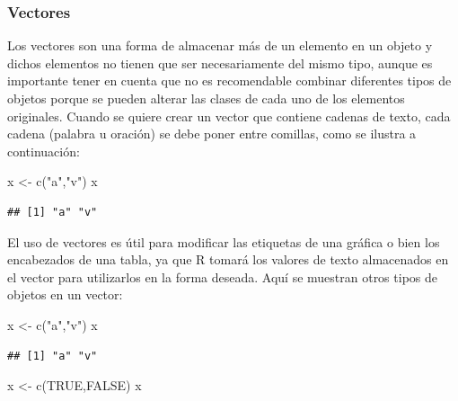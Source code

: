 \documentclass[
  11pt,
  oneside]{book}
\newenvironment{Shaded}{\begin{snugshade}}{\end{snugshade}}
\newcommand{\ConstantTok}[1]{\textcolor[rgb]{0.00,0.00,0.00}{#1}}
\newcommand{\FunctionTok}[1]{\textcolor[rgb]{0.00,0.00,0.00}{#1}}
\newcommand{\NormalTok}[1]{#1}
\newcommand{\OtherTok}[1]{\textcolor[rgb]{0.56,0.35,0.01}{#1}}
\newcommand{\StringTok}[1]{\textcolor[rgb]{0.31,0.60,0.02}{#1}}
\begin{document}
\hypertarget{vectores}{%
\subsubsection{Vectores}\label{vectores}}

Los vectores son una forma de almacenar más de un elemento en un objeto y dichos elementos no tienen que ser necesariamente del mismo tipo, aunque es importante tener en cuenta que no es recomendable combinar diferentes tipos de objetos porque se pueden alterar las clases de cada uno de los elementos originales. Cuando se quiere crear un vector que contiene cadenas de texto, cada cadena (palabra u oración) se debe poner entre comillas, como se ilustra a continuación:

\begin{Shaded}
\begin{Highlighting}[]
\NormalTok{x }\OtherTok{\textless{}{-}} \FunctionTok{c}\NormalTok{(}\StringTok{"a"}\NormalTok{,}\StringTok{"v"}\NormalTok{)}
\NormalTok{x}
\end{Highlighting}
\end{Shaded}

\begin{verbatim}
## [1] "a" "v"
\end{verbatim}

El uso de vectores es útil para modificar las etiquetas de una gráfica o bien los encabezados de una tabla, ya que R tomará los valores de texto almacenados en el vector para utilizarlos en la forma deseada. Aquí se muestran otros tipos de objetos en un vector:

\begin{Shaded}
\begin{Highlighting}[]
\NormalTok{x }\OtherTok{\textless{}{-}} \FunctionTok{c}\NormalTok{(}\StringTok{"a"}\NormalTok{,}\StringTok{"v"}\NormalTok{)}
\NormalTok{x}
\end{Highlighting}
\end{Shaded}

\begin{verbatim}
## [1] "a" "v"
\end{verbatim}

\begin{Shaded}
\begin{Highlighting}[]
\NormalTok{x }\OtherTok{\textless{}{-}} \FunctionTok{c}\NormalTok{(}\ConstantTok{TRUE}\NormalTok{,}\ConstantTok{FALSE}\NormalTok{)}
\NormalTok{x}
\end{Highlighting}
\end{Shaded}
\end{document}
